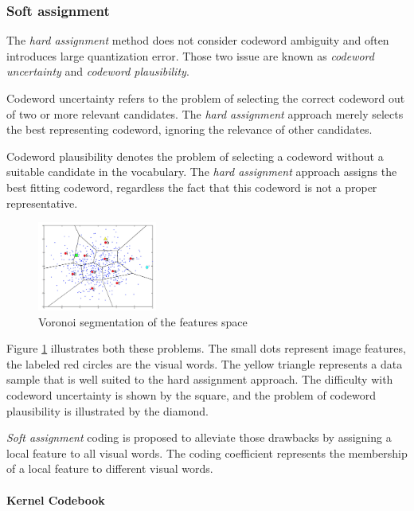 \subsubsection{Soft assignment}

The \emph{hard assignment} method does not consider codeword ambiguity and often introduces large quantization error. Those two issue are known as \emph{codeword uncertainty} and \emph{codeword plausibility}. 

Codeword uncertainty refers to the problem of selecting the correct codeword out of two or more relevant candidates. The \emph{hard assignment} approach merely selects the best representing codeword, ignoring the relevance of other candidates. 

Codeword plausibility denotes the problem of selecting a codeword without a suitable candidate in the vocabulary. The \emph{hard assignment} approach assigns the best fitting codeword, regardless the fact that this codeword is not a proper representative. 

\begin{figure}[h]
\begin{center}
\includegraphics[width=0.35\textwidth]{images/soft-assignment.jpg}
\end{center}
  \caption{Voronoi segmentation of the features space}
\label{fig:softAssignment}
\end{figure}

Figure \ref{fig:softAssignment} illustrates both these problems. The small dots represent image features, the labeled red circles are the visual words. The yellow triangle represents a data sample that is well suited to the hard assignment approach. The difficulty with codeword uncertainty is shown by the square, and the problem of codeword plausibility is illustrated by the diamond.

\emph{Soft assignment} coding is proposed to alleviate those drawbacks by assigning a local feature to all visual words. The coding coefficient represents the membership of a local feature to different visual words.

\paragraph{Kernel Codebook}

